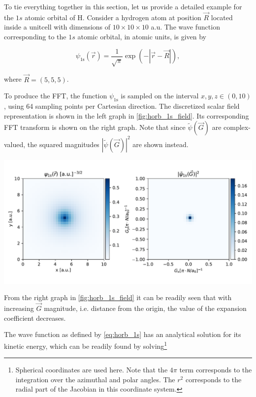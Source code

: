 To tie everything together in this section, let us provide a detailed example for the $1s$ atomic orbital of H. Consider a hydrogen atom at position $\vec{R}$ located inside a unitcell with dimensions of $10 \times 10 \times 10$ a.u. The wave function corresponding to the $1s$ atomic orbital, in atomic units, is given by

\begin{equation}
    \psi_{\text{1s}}(\vec{r}) = \frac{1}{\sqrt{\pi}} \exp \left( -|\vec{r} - \vec{R}| \right),
    \label{eq:horb_1s}
\end{equation}

where $\vec{R} = (5,5,5)$.

To produce the FFT, the function $\psi_{\text{1s}}$ is sampled on the interval $x,y,z \in (0,10)$, using 64 sampling points per Cartesian direction. The discretized scalar field representation is shown in the left graph in \cref{fig:horb_1s_field}. Its corresponding FFT transform is shown on the right graph. Note that since $\tilde{\psi}(\vec{G})$ are complex-valued, the squared magnitudes $\left|\tilde{\psi}(\vec{G})\right|^{2}$ are shown instead.

\begin{Figure}
    \centering
    \includegraphics[width=\linewidth]{img/fig3_horb1s_fields.pdf}
    \label{fig:horb_1s_field}
\end{Figure}

From the right graph in \cref{fig:horb_1s_field} it can be readily seen that with increasing $\vec{G}$ magnitude, i.e. distance from the origin, the value of the expansion coefficient decreases.

The wave function as defined by \cref{eq:horb_1s} has an analytical solution for its kinetic energy, which can be readily found by solving\footnote{Spherical coordinates are used here. Note that the $4\pi$ term corresponds to the integration over the azimuthal and polar angles. The $r^{2}$ corresponds to the radial part of the Jacobian in this coordinate system.}

